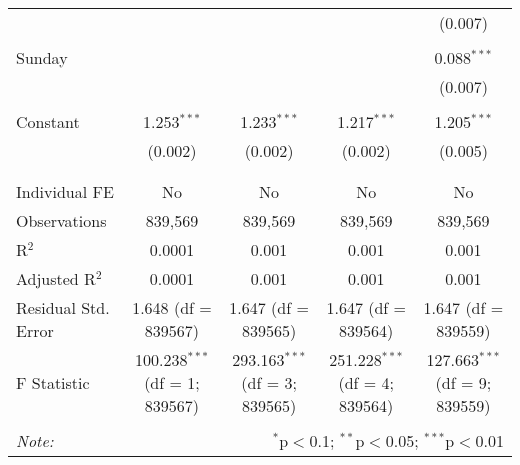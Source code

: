 \documentclass[
]{article}
\begin{document}
\begin{table}[!htbp]
{\begin{tabular}{@{\extracolsep{5pt}}lcccc}
  &  &  &  & (0.007) \\ 
  & & & & \\ 
 Sunday &  &  &  & 0.088$^{***}$ \\ 
  &  &  &  & (0.007) \\ 
  & & & & \\ 
 Constant & 1.253$^{***}$ & 1.233$^{***}$ & 1.217$^{***}$ & 1.205$^{***}$ \\ 
  & (0.002) & (0.002) & (0.002) & (0.005) \\ 
  & & & & \\ 
\hline \\[-1.8ex] 
Individual FE & No & No & No & No \\ 
Observations & 839,569 & 839,569 & 839,569 & 839,569 \\ 
R$^{2}$ & 0.0001 & 0.001 & 0.001 & 0.001 \\ 
Adjusted R$^{2}$ & 0.0001 & 0.001 & 0.001 & 0.001 \\ 
Residual Std. Error & 1.648 (df = 839567) & 1.647 (df = 839565) & 1.647 (df = 839564) & 1.647 (df = 839559) \\ 
F Statistic & 100.238$^{***}$ (df = 1; 839567) & 293.163$^{***}$ (df = 3; 839565) & 251.228$^{***}$ (df = 4; 839564) & 127.663$^{***}$ (df = 9; 839559) \\ 
\hline 
\hline \\[-1.8ex] 
\textit{Note:}  & \multicolumn{4}{r}{$^{*}$p$<$0.1; $^{**}$p$<$0.05; $^{***}$p$<$0.01} \\ 
\end{tabular}
} 
\end{table} 
\newpage
\end{document}
